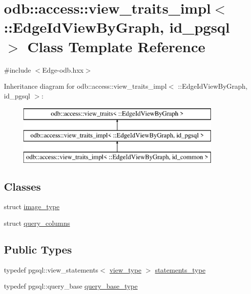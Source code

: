 \hypertarget{classodb_1_1access_1_1view__traits__impl_3_01_1_1_edge_id_view_by_graph_00_01id__pgsql_01_4}{}\section{odb\+:\+:access\+:\+:view\+\_\+traits\+\_\+impl$<$ \+:\+:Edge\+Id\+View\+By\+Graph, id\+\_\+pgsql $>$ Class Template Reference}
\label{classodb_1_1access_1_1view__traits__impl_3_01_1_1_edge_id_view_by_graph_00_01id__pgsql_01_4}


{\ttfamily \#include $<$Edge-\/odb.\+hxx$>$}

Inheritance diagram for odb\+:\+:access\+:\+:view\+\_\+traits\+\_\+impl$<$ \+:\+:Edge\+Id\+View\+By\+Graph, id\+\_\+pgsql $>$\+:\begin{figure}[H]
\begin{center}
\leavevmode
\includegraphics[height=3.000000cm]{dd/dbc/classodb_1_1access_1_1view__traits__impl_3_01_1_1_edge_id_view_by_graph_00_01id__pgsql_01_4}
\end{center}
\end{figure}
\subsection*{Classes}
\begin{DoxyCompactItemize}
\item 
struct \hyperlink{structodb_1_1access_1_1view__traits__impl_3_01_1_1_edge_id_view_by_graph_00_01id__pgsql_01_4_1_1image__type}{image\+\_\+type}
\item 
struct \hyperlink{structodb_1_1access_1_1view__traits__impl_3_01_1_1_edge_id_view_by_graph_00_01id__pgsql_01_4_1_1query__columns}{query\+\_\+columns}
\end{DoxyCompactItemize}
\subsection*{Public Types}
\begin{DoxyCompactItemize}
\item 
typedef pgsql\+::view\+\_\+statements$<$ \hyperlink{classodb_1_1access_1_1view__traits_3_01_1_1_edge_id_view_by_graph_01_4_a5c878e1df6ba367e257b6da8fcb92cae}{view\+\_\+type} $>$ \hyperlink{classodb_1_1access_1_1view__traits__impl_3_01_1_1_edge_id_view_by_graph_00_01id__pgsql_01_4_a0d91393fadacd4a8aee90569df84a193}{statements\+\_\+type}
\item 
typedef pgsql\+::query\+\_\+base \hyperlink{classodb_1_1access_1_1view__traits__impl_3_01_1_1_edge_id_view_by_graph_00_01id__pgsql_01_4_a671b622be60c353f020d89bb3e5b68ed}{query\+\_\+base\+\_\+type}
\end{DoxyCompactItemize}
